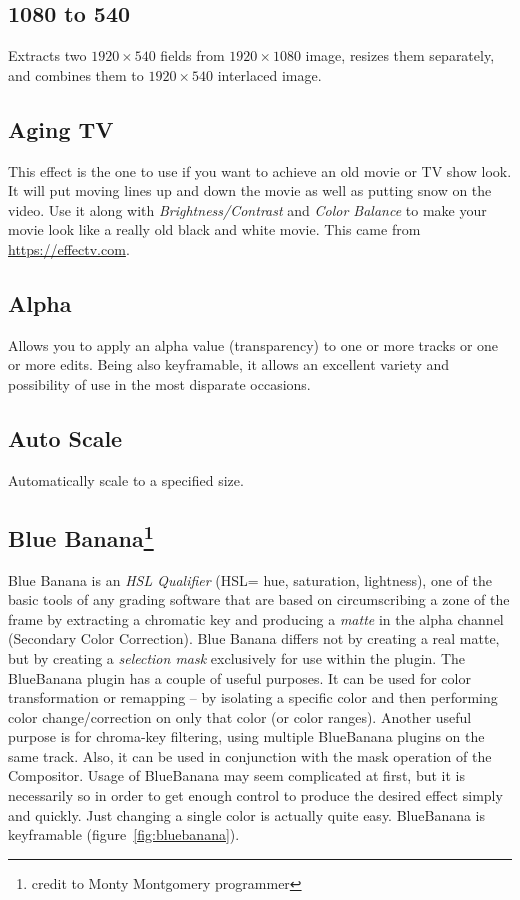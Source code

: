 \subsection{1080 to 540}%
\label{sub:1080_to_540}

Extracts two $1920\times540$ fields from $1920\times1080$ image, resizes them separately, and combines them to $1920\times540$ interlaced image.

\subsection{Aging TV}%
\label{sub:aging_tv}

This effect is the one to use if you want to achieve an old movie or TV show look. It will put moving lines up and down the movie as well as putting snow on the video. Use it along with \textit{Brightness/Contrast} and \textit{Color Balance} to make your movie look like a really old black and white movie. This came from \url{https://effectv.com}.

\subsection{Alpha}%
\label{sub:alpha}

Allows you to apply an alpha value (transparency) to one or more tracks or one or more edits. Being also keyframable, it allows an excellent variety and possibility of use in the most disparate occasions.

\subsection{Auto Scale}%
\label{sub:auto_scale}

Automatically scale to a specified size.

\subsection{Blue Banana\protect\footnote{credit to Monty Montgomery programmer}}%
\label{sub:blue_banana}

Blue Banana is an \textit{HSL Qualifier} (HSL= hue, saturation, lightness), one of the basic tools of any grading software that are based on circumscribing a zone of the frame by extracting a chromatic key and producing a \textit{matte} in the alpha channel (Secondary Color Correction). Blue Banana differs not by creating a real matte, but by creating a \textit{selection mask} exclusively for use within the plugin. The BlueBanana plugin has a couple of useful purposes. It can be used for color transformation or remapping -- by isolating a specific color and then performing color change/correction on only that color (or color ranges). Another useful purpose is for chroma-key filtering, using multiple BlueBanana plugins on the same track. Also, it can be used in conjunction with the mask operation of the Compositor. Usage of BlueBanana may seem complicated at first, but it is necessarily so in order to get enough control to produce the desired effect simply and quickly. Just changing a single color is actually quite easy. BlueBanana is keyframable (figure~\ref{fig:bluebanana}).

